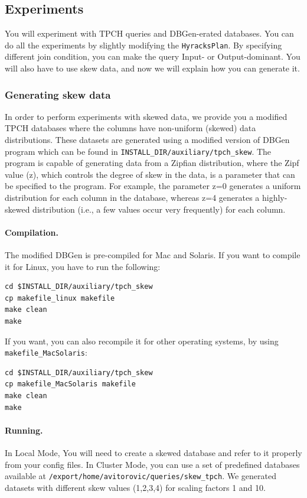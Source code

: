 \documentclass[a4paper,10pt]{article}
\begin{document}
\subsection{Experiments}\label{experiments}
You will experiment with TPCH queries and DBGen-erated databases. You can do all the experiments by slightly modifying the \verb#HyracksPlan#. By specifying different join condition, you can make the query Input- or Output-dominant. You will also have to use skew data, and now we will explain how you can generate it.

\subsubsection{Generating skew data}
In order to perform experiments with skewed data, we provide you a modified TPCH databases where the columns have non-uniform (skewed) data distributions. These datasets are generated using a modified version of DBGen program which can be found in \verb#INSTALL_DIR/auxiliary/tpch_skew#. The program is capable of generating data from a Zipfian distribution, where the Zipf value (z), which controls the degree of skew in the data, is a parameter that can be specified to the program. For example, the parameter z=0 generates a uniform distribution for each column in the database, whereas z=4 generates a highly-skewed distribution (i.e., a few values occur very frequently) for each column.

\paragraph{Compilation.} The modified DBGen is pre-compiled for Mac and Solaris. If you want to compile it for Linux, you have to run the following:
\begin{verbatim}
cd $INSTALL_DIR/auxiliary/tpch_skew
cp makefile_linux makefile
make clean
make
\end{verbatim}

If you want, you can also recompile it for other operating systems, by using \verb#makefile_MacSolaris#:
\begin{verbatim}
cd $INSTALL_DIR/auxiliary/tpch_skew
cp makefile_MacSolaris makefile
make clean
make
\end{verbatim}

\paragraph{Running.} In Local Mode, You will need to create a skewed database and refer to it properly from your config files. In Cluster Mode, you can use a set of predefined databases available at \verb#/export/home/avitorovic/queries/skew_tpch#. We generated datasets with different skew values (1,2,3,4) for scaling factors 1 and 10.
\end{document}
